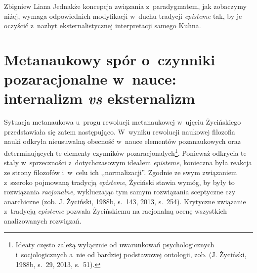 \begin{artplenv}{Zbigniew Liana}
Jednakże koncepcja związania z~paradygmatem, jak zobaczymy niżej, wymaga odpowiednich modyfikacji w~duchu tradycji
\textit{episteme} tak, by je oczyścić z~nazbyt eksternalistycznej interpretacji samego Kuhna.

\section{Metanaukowy spór o~czynniki pozaracjonalne w~nauce: internalizm \textit{vs} eksternalizm}

Sytuacja metanaukowa u~progu rewolucji metanaukowej w~ujęciu Życińskiego przedstawiała się zatem następująco. W~wyniku
rewolucji naukowej filozofia nauki odkryła nieusuwalną obecność w~nauce elementów pozanaukowych oraz determinujących te
elementy czynników pozaracjonalych\footnote{Ideaty często zależą wyłącznie od uwarunkowań
psychologicznych i~socjologicznych a~nie od bardziej podstawowej ontologii, zob. \label{ref:RNDZ7VFgO3ocx}(J. Życiński, 1988b, s.~29,
2013, s.~51).}. Ponieważ odkrycia te stały w~sprzeczności z~dotychczasowym ideałem \textit{episteme}, konieczna była
reakcja ze strony filozofów i~w~celu ich ,,normalizacji''. Zgodnie ze swym związaniem z~szeroko pojmowaną tradycją
\textit{episteme}, Życiński stawia wymóg, by były to rozwiązania \textit{racjonalne}, wykluczając tym samym rozwiązania
sceptyczne czy anarchiczne \label{ref:RNDlHYNmrMqD0}(zob. J. Życiński, 1988b, s.~143, 2013, s.~254). Krytyczne
związanie z~tradycją \textit{episteme} pozwala Życińskiemu na racjonalną ocenę wszystkich analizowanych rozwiązań.


\end{artplenv}
